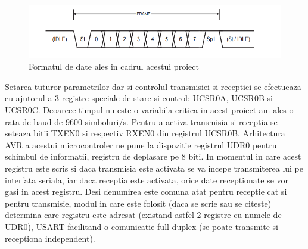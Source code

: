\documentclass[12pt]{article}
\begin{document}
\begin{figure}[H]
\centering
\includegraphics[width=\textwidth]{Pictures/frame.png}
\caption{Formatul de date ales in cadrul acestui proiect}
\end{figure}

\vspace{4 mm}

\hspace{8 mm} Setarea tuturor parametrilor dar si controlul transmisiei si receptiei se efectueaza cu ajutorul a 3 registre speciale de stare si control: UCSR0A, UCSR0B si UCSR0C. Deoarece timpul nu este o variabila critica in acest proiect am ales o rata de baud de 9600 simboluri/s. Pentru a activa transmisia si receptia se seteaza bitii TXEN0 si respectiv RXEN0 din registrul UCSR0B. Arhitectura AVR a acestui microcontroler ne pune la dispozitie registrul UDR0 pentru schimbul de informatii, registru de deplasare pe 8 biti. In momentul in care acest registru este scris si daca transmisia este activata se va incepe transmiterea lui pe interfata seriala, iar daca receptia este activata, orice date receptionate se vor gasi in acest registru. Desi denumirea este comuna atat pentru receptie cat si pentru transmisie, modul in care este folosit (daca se scrie sau se citeste) determina care registru este adresat (existand astfel 2 registre cu numele de UDR0), USART facilitand o comunicatie full duplex (se poate transmite si receptiona independent).
\vspace{4 mm}
\end{document}
